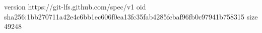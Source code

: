 version https://git-lfs.github.com/spec/v1
oid sha256:1bb270711a42e4c6bb1ec606f0ea13fc35fab4285fcbaf96fb0c97941b758315
size 49248
